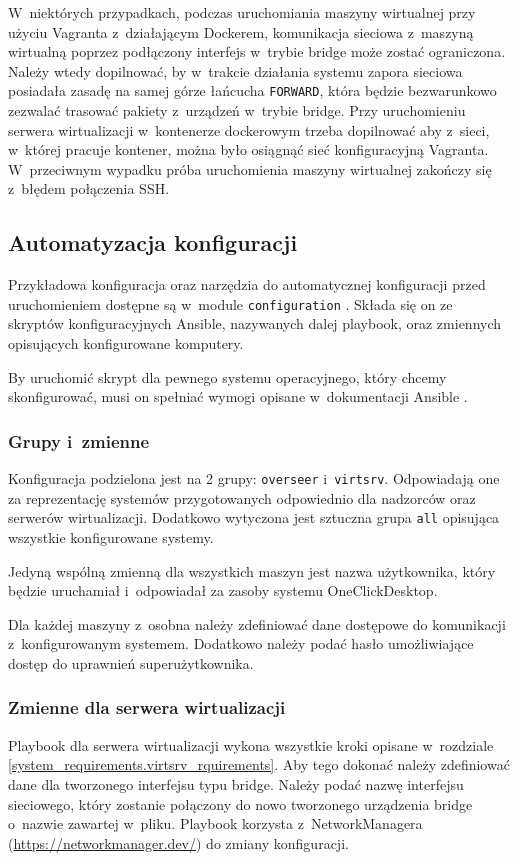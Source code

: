 \documentclass[../opis-rozwiazania.tex]{subfiles}
\begin{document}
W~niektórych przypadkach, podczas uruchomiania maszyny wirtualnej przy użyciu Vagranta z~działającym Dockerem, komunikacja sieciowa z~maszyną wirtualną poprzez podłączony interfejs w~trybie bridge może zostać ograniczona.
Należy wtedy dopilnować, by w~trakcie działania systemu zapora sieciowa posiadała zasadę na samej górze łańcucha \texttt{FORWARD}, która będzie bezwarunkowo zezwalać trasować pakiety z~urządzeń w~trybie bridge.
Przy uruchomieniu serwera wirtualizacji w~kontenerze dockerowym trzeba dopilnować aby z~sieci, w~której pracuje kontener, można było osiągnąć sieć konfiguracyjną Vagranta.
W~przeciwnym wypadku próba uruchomienia maszyny wirtualnej zakończy się z~błędem połączenia SSH.

\subsection{Automatyzacja konfiguracji}
\label{system_requirements.ansible_conf}
Przykładowa konfiguracja oraz narzędzia do automatycznej konfiguracji przed uruchomieniem dostępne są w~module \texttt{configuration} \parencite{ocd-configuration}.
Składa się on ze skryptów konfiguracyjnych Ansible, nazywanych dalej playbook, oraz zmiennych opisujących konfigurowane komputery.

By uruchomić skrypt dla pewnego systemu operacyjnego, który chcemy skonfigurować, musi on spełniać wymogi opisane w~dokumentacji Ansible \parencite{ansible-connection}.

\subsubsection{Grupy i~zmienne}
Konfiguracja podzielona jest na 2 grupy: \texttt{overseer} i~\texttt{virtsrv}.
Odpowiadają one za reprezentację systemów przygotowanych odpowiednio dla nadzorców oraz serwerów wirtualizacji.
Dodatkowo wytyczona jest sztuczna grupa \texttt{all} opisująca wszystkie konfigurowane systemy.

Jedyną wspólną zmienną dla wszystkich maszyn jest nazwa użytkownika, który będzie uruchamiał i~odpowiadał za zasoby systemu OneClickDesktop.

Dla każdej maszyny z~osobna należy zdefiniować dane dostępowe do komunikacji z~konfigurowanym systemem. Dodatkowo należy podać hasło umożliwiające dostęp do uprawnień superużytkownika.

\subsubsection{Zmienne dla serwera wirtualizacji}
Playbook dla serwera wirtualizacji wykona wszystkie kroki opisane w~rozdziale \ref{system_requirements.virtsrv_rquirements}.
Aby tego dokonać należy zdefiniować dane dla tworzonego interfejsu typu bridge.
Należy podać nazwę interfejsu sieciowego, który zostanie połączony do nowo tworzonego urządzenia bridge o~nazwie zawartej w~pliku.
Playbook korzysta z~NetworkManagera (\url{https://networkmanager.dev/}) do zmiany konfiguracji.
\end{document}
